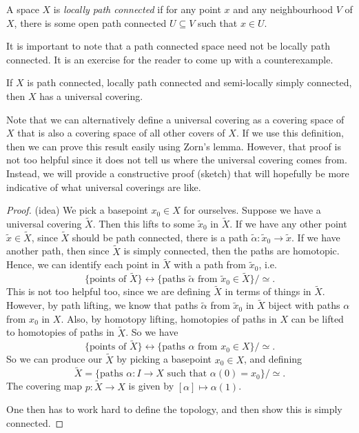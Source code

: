 \documentclass[a4paper]{article}
\begin{document}
\begin{defi}
  A space $X$ is \emph{locally path connected} if for any point $x$ and any neighbourhood $V$ of $X$, there is some open path connected $U \subseteq V$ such that $x \in U$.
\end{defi}

It is important to note that a path connected space need not be locally path connected. It is an exercise for the reader to come up with a counterexample.

\begin{thm}
  If $X$ is path connected, locally path connected and semi-locally simply connected, then $X$ has a universal covering.
\end{thm}
Note that we can alternatively define a universal covering as a covering space of $X$ that is also a covering space of all other covers of $X$. If we use this definition, then we can prove this result easily using Zorn's lemma. However, that proof is not too helpful since it does not tell us where the universal covering comes from. Instead, we will provide a constructive proof (sketch) that will hopefully be more indicative of what universal coverings are like.

\begin{proof}(idea)
  We pick a basepoint $x_0 \in X$ for ourselves. Suppose we have a universal covering $\tilde{X}$. Then this lifts to some $\tilde{x}_0$ in $\tilde{X}$. If we have any other point $\tilde{x} \in \tilde{X}$, since $\tilde{X}$ should be path connected, there is a path $\tilde{\alpha}: \tilde{x}_0 \to \tilde{x}$. If we have another path, then since $\tilde{X}$ is simply connected, then the paths are homotopic. Hence, we can identify each point in $\tilde{X}$ with a path from $\tilde{x}_0$, i.e.
  \[
    \{\text{points of }\tilde{X}\} \longleftrightarrow \{\text{paths }\tilde{\alpha}\text{ from }\tilde{x}_0\in \tilde{X}\}/{\simeq}.
  \]
  This is not too helpful too, since we are defining $\tilde{X}$ in terms of things in $\tilde{X}$. However, by path lifting, we know that paths $\tilde{\alpha}$ from $\tilde{x}_0$ in $\tilde{X}$ biject with paths $\alpha$ from $x_0$ in $X$. Also, by homotopy lifting, homotopies of paths in $X$ can be lifted to homotopies of paths in $\tilde{X}$. So we have
  \[
    \{\text{points of }\tilde{X}\} \longleftrightarrow \{\text{paths }\alpha\text{ from }x_0 \in X\}/{\simeq}.
  \]
  So we can produce our $\tilde{X}$ by picking a basepoint $x_0 \in X$, and defining
  \[
    \tilde{X} = \{\text{paths }\alpha: I\to X\text{ such that }\alpha(0) = x_0\}/{\simeq}.
  \]
  The covering map $p: \tilde{X} \to X$ is given by $[\alpha] \mapsto \alpha(1)$.

  One then has to work hard to define the topology, and then show this is simply connected. %
\end{proof}
\end{document}
